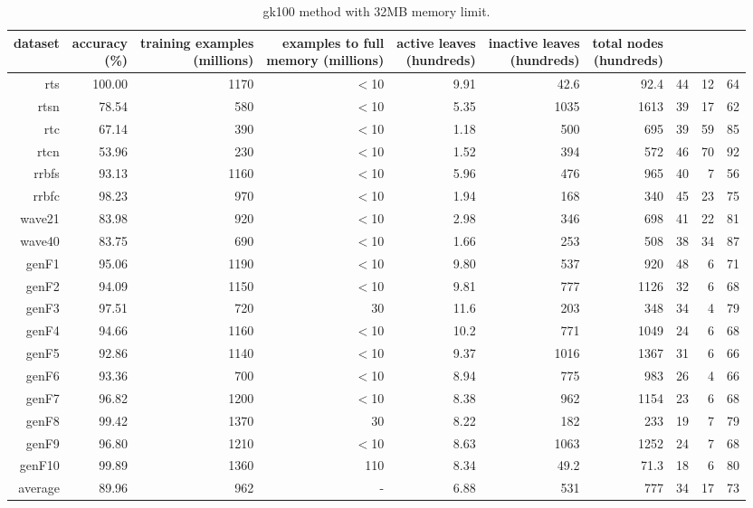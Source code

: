 \clearpage
\begin{table}
\caption{{\sc gk100} method with 32MB memory limit.}
\label{tab:gk100-32MB}
\centering
\begin{tabular}{|r|r|r|r|r|r|r|r|r|r|}
\hline
dataset	&
\rotatebox{90}{\parbox{9em}{accuracy\\(\%)}} &
\rotatebox{90}{\parbox{9em}{training examples\\(millions)}} &
\rotatebox{90}{\parbox{9em}{examples to full\\memory (millions)}} &
\rotatebox{90}{\parbox{9em}{active leaves\\(hundreds)}} &
\rotatebox{90}{\parbox{9em}{inactive leaves\\(hundreds)}} &
\rotatebox{90}{\parbox{9em}{total nodes\\(hundreds)}} &
\rotatebox{90}{\parbox{9em}{tree depth}}	&
\rotatebox{90}{\parbox{9em}{training speed (\%)}} &
\rotatebox{90}{\parbox{9em}{prediction speed (\%)}} \\
\hline
{\sc rts} & 100.00 & 1170 & $<$10 & 9.91 & 42.6 & 92.4 & 44 & 12 & 64 \\
{\sc rtsn} & 78.54 & 580 & $<$10 & 5.35 & 1035 & 1613 & 39 & 17 & 62 \\
{\sc rtc} & 67.14 & 390 & $<$10 & 1.18 & 500 & 695 & 39 & 59 & 85 \\
{\sc rtcn} & 53.96 & 230 & $<$10 & 1.52 & 394 & 572 & 46 & 70 & 92 \\
{\sc rrbfs} & 93.13 & 1160 & $<$10 & 5.96 & 476 & 965 & 40 & 7 & 56 \\
{\sc rrbfc} & 98.23 & 970 & $<$10 & 1.94 & 168 & 340 & 45 & 23 & 75 \\
{\sc wave21} & 83.98 & 920 & $<$10 & 2.98 & 346 & 698 & 41 & 22 & 81 \\
{\sc wave40} & 83.75 & 690 & $<$10 & 1.66 & 253 & 508 & 38 & 34 & 87 \\
{\sc genF1} & 95.06 & 1190 & $<$10 & 9.80 & 537 & 920 & 48 & 6 & 71 \\
{\sc genF2} & 94.09 & 1150 & $<$10 & 9.81 & 777 & 1126 & 32 & 6 & 68 \\
{\sc genF3} & 97.51 & 720 & 30 & 11.6 & 203 & 348 & 34 & 4 & 79 \\
{\sc genF4} & 94.66 & 1160 & $<$10 & 10.2 & 771 & 1049 & 24 & 6 & 68 \\
{\sc genF5} & 92.86 & 1140 & $<$10 & 9.37 & 1016 & 1367 & 31 & 6 & 66 \\
{\sc genF6} & 93.36 & 700 & $<$10 & 8.94 & 775 & 983 & 26 & 4 & 66 \\
{\sc genF7} & 96.82 & 1200 & $<$10 & 8.38 & 962 & 1154 & 23 & 6 & 68 \\
{\sc genF8} & 99.42 & 1370 & 30 & 8.22 & 182 & 233 & 19 & 7 & 79 \\
{\sc genF9} & 96.80 & 1210 & $<$10 & 8.63 & 1063 & 1252 & 24 & 7 & 68 \\
{\sc genF10} & 99.89 & 1360 & 110 & 8.34 & 49.2 & 71.3 & 18 & 6 & 80 \\
\hline
average & 89.96 & 962 &  -  & 6.88 & 531 & 777 & 34 & 17 & 73 \\
\hline
\end{tabular}
\end{table}
